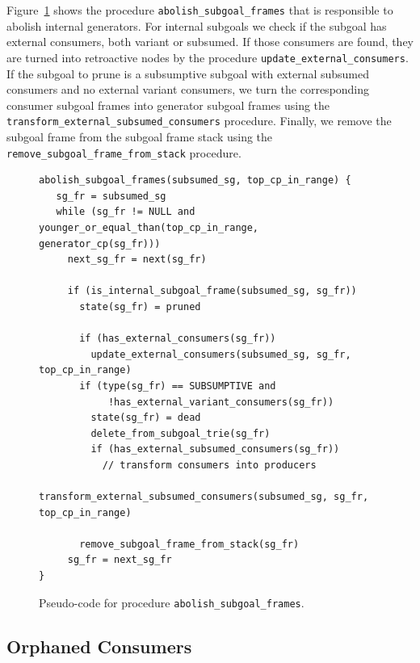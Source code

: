 Figure~\ref{fig:abolish_subgoal_frames} shows the procedure \texttt{abolish\_subgoal\_frames} that is
responsible to abolish internal generators. For internal subgoals we check if the
subgoal has external consumers, both variant or subsumed. If those consumers are found, they are turned
into retroactive nodes by the procedure \texttt{update\_external\_consumers}. If the subgoal to prune is
a subsumptive subgoal with external subsumed consumers and no external variant consumers, we turn the corresponding
consumer subgoal frames into generator subgoal frames using the \texttt{transform\_external\_subsumed\_consumers} procedure.
Finally, we remove the subgoal frame from the subgoal frame stack using the
\texttt{remove\_subgoal\_frame\_from\_stack} procedure.

\begin{figure}[ht]
\begin{Verbatim}
abolish_subgoal_frames(subsumed_sg, top_cp_in_range) {
   sg_fr = subsumed_sg
   while (sg_fr != NULL and younger_or_equal_than(top_cp_in_range, generator_cp(sg_fr)))
     next_sg_fr = next(sg_fr)

     if (is_internal_subgoal_frame(subsumed_sg, sg_fr))
       state(sg_fr) = pruned
         
       if (has_external_consumers(sg_fr))
         update_external_consumers(subsumed_sg, sg_fr, top_cp_in_range)
       if (type(sg_fr) == SUBSUMPTIVE and
            !has_external_variant_consumers(sg_fr))
         state(sg_fr) = dead
         delete_from_subgoal_trie(sg_fr)
         if (has_external_subsumed_consumers(sg_fr))
           // transform consumers into producers
           transform_external_subsumed_consumers(subsumed_sg, sg_fr, top_cp_in_range)
           
       remove_subgoal_frame_from_stack(sg_fr)
     sg_fr = next_sg_fr
}
\end{Verbatim}
\caption{Pseudo-code for procedure \texttt{abolish\_subgoal\_frames}.}
\label{fig:abolish_subgoal_frames}
\end{figure}

\subsection{Orphaned Consumers}

